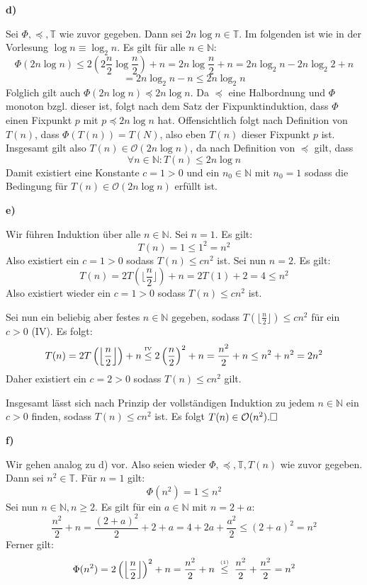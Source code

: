 \documentclass[a4paper,graphics,11pt]{article}
\newcommand{\up}[2]{\mathrel{\overset{\makebox[0pt]{\mbox{\normalfont\tiny #2}}}{#1}}}
\begin{document}
\textbf{d)}

Sei $\Phi, \preceq, \mathbb{T}$ wie zuvor gegeben. Dann sei $2n \log n \in \mathbb{T}$. Im folgenden ist wie in der Vorlesung $\log n \equiv \log_2 n$. Es gilt
für alle $n \in \mathbb{N}$:
$$
    \Phi(2n\log n)
    \leq 2\left(2\frac{n}{2} \log \frac{n}{2}\right) + n
    = 2n\log\frac{n}{2} + n
    = 2n\log_2 n - 2n \log_2 2 + n
$$$$
    = 2n \log_2 n - n
    \leq 2n \log_2 n
$$
Folglich gilt auch $\Phi(2n \log n)\preceq 2n \log n$. Da $\preceq$ eine Halbordnung und
$\Phi$ monoton bzgl. dieser ist, folgt nach dem Satz der Fixpunktinduktion, dass $\Phi$ einen
Fixpunkt $p$ mit $p \preceq 2n\log n$ hat. Offensichtlich folgt nach Definition von $T(n)$,
dass $\Phi(T(n)) = T(N)$, also eben $T(n)$ dieser Fixpunkt $p$ ist.
Insgesamt gilt also $T(n) \in \mathcal{O}(2n\log n)$, da nach Definition von $\preceq$ gilt,
dass
$$
\forall n \in \mathbb{N} : T(n) \leq 2n\log n
$$
Damit existiert eine Konstante $c = 1 > 0$ und ein $n_0 \in \mathbb{N}$ mit $n_0 = 1$ sodass
die Bedingung für $T(n) \in \mathcal{O}(2n\log n)$ erfüllt ist.

\newpage
\textbf{e)}

Wir führen Induktion über alle $n \in \mathbb{N}$.
Sei $n = 1$. Es gilt:
$$
    T(n) = 1 \leq 1^2 = n^2
$$
Also existiert ein $c = 1 > 0$ sodass $T(n) \leq c n^2$ ist.
Sei nun $n = 2$. Es gilt:
$$
    T(n)
    = 2 T\left(\bigg\lfloor \frac{n}{2}\bigg\rfloor\right) + n
    = 2 T(1) + 2
    = 4
    \leq n^2
$$
Also existiert wieder ein $c = 1 > 0$ sodass $T(n) \leq c n^2$ ist.

Sei nun ein beliebig aber festes $n \in \mathbb{N}$ gegeben, sodass $T(\lfloor \frac{n}{2} \rfloor) \leq cn^2$ für ein $c > 0$ (IV).
Es folgt:
$$
    T(n) = 2 T\left(\left\lfloor \frac{n}{2} \right\rfloor\right)+n
    \up{\leq}{IV} 2 \left(\frac{n}{2}\right)^2+ n
    = \frac{n^2}{2} + n
    \leq n^2 + n^2 = 2n^2
$$
Daher existiert ein $c = 2 > 0$ sodass $T(n) \leq cn^2$ gilt.

Insgesamt lässt sich nach Prinzip der vollständigen Induktion zu jedem $n \in \mathbb{N}$ ein $c > 0$
finden, sodass $T(n) \leq cn^2$ ist. Es folgt $T(n) \in \mathcal{O}(n^2).\hfill\square$

\textbf{f)}

Wir gehen analog zu d) vor. Also seien wieder $\Phi, \preceq, \mathbb{T}, T(n)$ wie zuvor gegeben.\\
Dann sei $n^2 \in \mathbb{T}$. Für $n = 1$ gilt:
$$
    \Phi(n^2) = 1 \leq n^2
$$
Sei nun $n \in \mathbb{N}, n\geq 2$. Es gilt für ein $a \in \mathbb{N}$ mit $n = 2+a$:
\begin{equation}
    \frac{n^2}{2} + n = \frac{(2+a)^2}{2} + 2+a = 4 + 2a +\frac{a^2}{2} \leq (2+a)^2 = n^2
\end{equation}
Ferner gilt:
$$
    \Phi(n^2) = 2 \left(\left\lfloor\frac{n}{2}\right\rfloor\right)^2 + n
    = \frac{n^2}{2} + n
    \ \up{\leq}{(1)}\ \frac{n^2}{2} + \frac{n^2}{2}
    = n^2
$$
\end{document}
